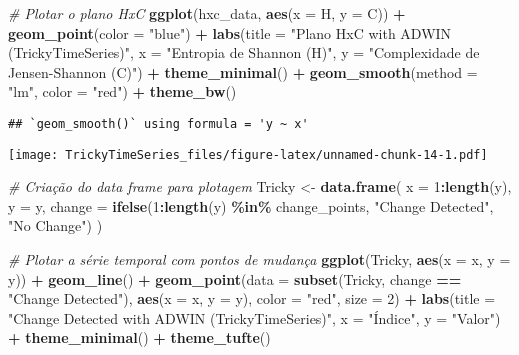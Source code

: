 \documentclass[
]{article}
\newenvironment{Shaded}{\begin{snugshade}}{\end{snugshade}}
\newcommand{\AttributeTok}[1]{\textcolor[rgb]{0.13,0.29,0.53}{#1}}
\newcommand{\CommentTok}[1]{\textcolor[rgb]{0.56,0.35,0.01}{\textit{#1}}}
\newcommand{\DecValTok}[1]{\textcolor[rgb]{0.00,0.00,0.81}{#1}}
\newcommand{\FunctionTok}[1]{\textcolor[rgb]{0.13,0.29,0.53}{\textbf{#1}}}
\newcommand{\NormalTok}[1]{#1}
\newcommand{\OtherTok}[1]{\textcolor[rgb]{0.56,0.35,0.01}{#1}}
\newcommand{\SpecialCharTok}[1]{\textcolor[rgb]{0.81,0.36,0.00}{\textbf{#1}}}
\newcommand{\StringTok}[1]{\textcolor[rgb]{0.31,0.60,0.02}{#1}}
\begin{document}
\begin{Shaded}
\begin{Highlighting}[]
\CommentTok{\# Plotar o plano HxC}
\FunctionTok{ggplot}\NormalTok{(hxc\_data, }\FunctionTok{aes}\NormalTok{(}\AttributeTok{x =}\NormalTok{ H, }\AttributeTok{y =}\NormalTok{ C)) }\SpecialCharTok{+}
  \FunctionTok{geom\_point}\NormalTok{(}\AttributeTok{color =} \StringTok{"blue"}\NormalTok{) }\SpecialCharTok{+}
  \FunctionTok{labs}\NormalTok{(}\AttributeTok{title =} \StringTok{"Plano HxC with ADWIN (TrickyTimeSeries)"}\NormalTok{,}
       \AttributeTok{x =} \StringTok{"Entropia de Shannon (H)"}\NormalTok{, }\AttributeTok{y =} \StringTok{"Complexidade de Jensen{-}Shannon (C)"}\NormalTok{) }\SpecialCharTok{+}
  \FunctionTok{theme\_minimal}\NormalTok{() }\SpecialCharTok{+}
  \FunctionTok{geom\_smooth}\NormalTok{(}\AttributeTok{method =} \StringTok{"lm"}\NormalTok{, }\AttributeTok{color =} \StringTok{"red"}\NormalTok{) }\SpecialCharTok{+}
  \FunctionTok{theme\_bw}\NormalTok{()}
\end{Highlighting}
\end{Shaded}

\begin{verbatim}
## `geom_smooth()` using formula = 'y ~ x'
\end{verbatim}

\texttt{[image: TrickyTimeSeries\_files/figure-latex/unnamed-chunk-14-1.pdf]}

\begin{Shaded}
\begin{Highlighting}[]
\CommentTok{\# Criação do data frame para plotagem}
\NormalTok{Tricky }\OtherTok{\textless{}{-}} \FunctionTok{data.frame}\NormalTok{(}
  \AttributeTok{x =} \DecValTok{1}\SpecialCharTok{:}\FunctionTok{length}\NormalTok{(y), }
  \AttributeTok{y =}\NormalTok{ y, }
  \AttributeTok{change =} \FunctionTok{ifelse}\NormalTok{(}\DecValTok{1}\SpecialCharTok{:}\FunctionTok{length}\NormalTok{(y) }\SpecialCharTok{\%in\%}\NormalTok{ change\_points, }\StringTok{"Change Detected"}\NormalTok{, }\StringTok{"No Change"}\NormalTok{)}
\NormalTok{)}

\CommentTok{\# Plotar a série temporal com pontos de mudança}
\FunctionTok{ggplot}\NormalTok{(Tricky, }\FunctionTok{aes}\NormalTok{(}\AttributeTok{x =}\NormalTok{ x, }\AttributeTok{y =}\NormalTok{ y)) }\SpecialCharTok{+}
  \FunctionTok{geom\_line}\NormalTok{() }\SpecialCharTok{+}
  \FunctionTok{geom\_point}\NormalTok{(}\AttributeTok{data =} \FunctionTok{subset}\NormalTok{(Tricky, change }\SpecialCharTok{==} \StringTok{"Change Detected"}\NormalTok{), }\FunctionTok{aes}\NormalTok{(}\AttributeTok{x =}\NormalTok{ x, }\AttributeTok{y =}\NormalTok{ y), }\AttributeTok{color =} \StringTok{"red"}\NormalTok{, }\AttributeTok{size =} \DecValTok{2}\NormalTok{) }\SpecialCharTok{+}
  \FunctionTok{labs}\NormalTok{(}\AttributeTok{title =} \StringTok{"Change Detected with ADWIN (TrickyTimeSeries)"}\NormalTok{, }\AttributeTok{x =} \StringTok{"Índice"}\NormalTok{, }\AttributeTok{y =} \StringTok{"Valor"}\NormalTok{) }\SpecialCharTok{+}
  \FunctionTok{theme\_minimal}\NormalTok{() }\SpecialCharTok{+}
  \FunctionTok{theme\_tufte}\NormalTok{()}
\end{Highlighting}
\end{Shaded}
\end{document}
